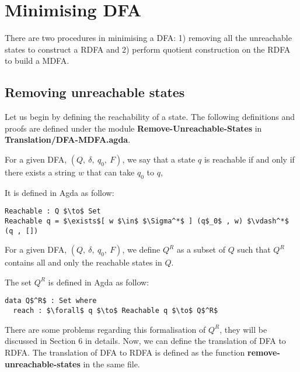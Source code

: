 \section{Minimising DFA}
\par There are two procedures in minimising a DFA: 1) removing all the
unreachable states to construct a RDFA and 2) perform quotient
construction on the RDFA to build a MDFA. 

\subsection{Removing unreachable states}
\par Let us begin by defining the
reachability of a state. The following definitions and proofs are
defined under the module \textbf{Remove-Unreachable-States} in
\textbf{Translation/DFA-MDFA.agda}. 

\begin{defn}
\noindent For a given DFA, \((Q,\ \delta,\ q_0,\ F)\), we say that a state \(q\) is reachable if and
only if there exists a string \(w\) that can take \(q_0\) to \(q\), 
\end{defn} 

\par It is defined in Agda as follow:
\begin{lstlisting}[mathescape=true,xleftmargin=.3\textwidth]
Reachable : Q $\to$ Set
Reachable q = $\exists$[ w $\in$ $\Sigma^*$ ] (q$_0$ , w) $\vdash^*$ (q , [])
\end{lstlisting}

\begin{defn}
\noindent For a given DFA, \((Q,\ \delta,\ q_0,\ F)\), we define \(Q^R\) as a
subset of \(Q\) such that \(Q^R\) contains all and only the reachable states in \(Q\). 
\end{defn}

\par The set \(Q^R\) is defined in Agda as follow:
\begin{lstlisting}[mathescape=true,xleftmargin=.3\textwidth]
data Q$^R$ : Set where
  reach : $\forall$ q $\to$ Reachable q $\to$ Q$^R$
\end{lstlisting}

\par There are some problems regarding this formalisation of \(Q^R\),
they will be discussed in Section 6 in details. Now, we can define the
translation of DFA to RDFA. The translation of DFA to RDFA is defined
as the function \textbf{remove-unreachable-states} in the same file. 


